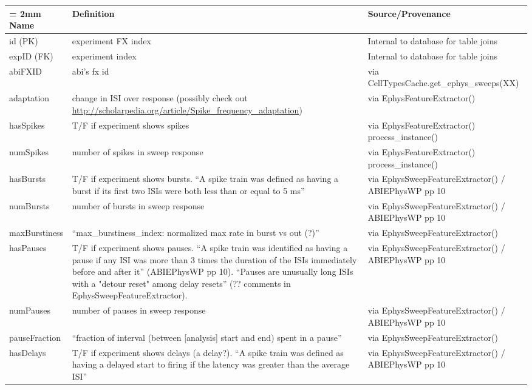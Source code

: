 \documentclass[landscape]{article}
\begin{document}
\vspace{2mm}
\begin{tabu}{X[1,r,p]|X[5,l,p]|X[4,l,p]}
\extrarowsep = 2mm
\normalsize{Name} & \normalsize{Definition} & \normalsize{Source/Provenance} \\
\hline
id (PK)			&  experiment FX index 										& Internal to database for table joins  \\
expID (FK)		&  experiment index 										& Internal to database for table joins  \\
abiFXID			&  abi's fx id 												& via CellTypesCache.get\_ephys\_sweeps(XX) \\
adaptation		&  change in ISI over response (possibly check out \url{http://scholarpedia.org/article/Spike_frequency_adaptation})								
																			& via EphysFeatureExtractor() \\
\hline
hasSpikes		&  T/F if experiment shows spikes 							& via EphysFeatureExtractor() process\_instance() \\
numSpikes		&  number of spikes in sweep response 						& via EphysFeatureExtractor() process\_instance() \\
hasBursts		&  T/F if experiment shows bursts. ``A spike train was defined as having a burst if its first two ISIs were both less than or equal to 5 ms'' 							& via EphysSweepFeatureExtractor() / ABIEPhysWP pp 10 \\
numBursts		&  number of bursts in sweep response 						& via EphysSweepFeatureExtractor() / ABIEPhysWP pp 10 \\
\hline
maxBurstiness	& ``max\_burstiness\_index: normalized max rate in burst vs out (?)'' & via EphysSweepFeatureExtractor()  \\
hasPauses		&  T/F if experiment shows pauses. ``A spike train was identified as having a pause if any ISI was more than 3 times the duration of the ISIs immediately before and after it'' (ABIEPhysWP pp 10).  ``Pauses are unusually long ISIs with a "detour reset" among delay resets'' (?? comments in EphysSweepFeatureExtractor). 
																			&  via EphysSweepFeatureExtractor()  / ABIEPhysWP pp 10 \\
numPauses		&  number of pauses in sweep response 						&  via EphysSweepFeatureExtractor()  / ABIEPhysWP pp 10 \\
pauseFraction	&  ``fraction of interval (between [analysis] start and end) spent in a pause''
																			&  via EphysSweepFeatureExtractor() \\
\hline
hasDelays		&  T/F if experiment shows delays (a delay?). ``A spike train was defined as having a delayed start to firing if the latency was greater than the average ISI'' 																				& via EphysSweepFeatureExtractor()  / ABIEPhysWP pp 10  \\

\end{tabu}
\end{document}
